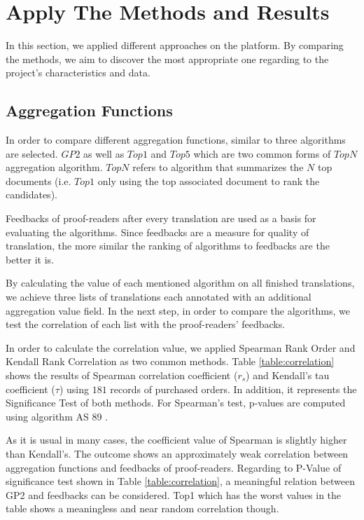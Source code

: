 \section{Apply The Methods and Results}
\label{sec:apply}
In this section, we applied different approaches on the platform. By comparing the methods, we aim to discover the most appropriate one regarding to the project's characteristics and data.

\subsection{Aggregation Functions}
In order to compare different aggregation functions, similar to \citet{agg-gp2} three algorithms are selected. $GP2$ as well as $Top1$ and $Top5$ which are two common forms of $TopN$ aggregation algorithm. $TopN$ refers to algorithm that summarizes the $N$ top documents (i.e. $Top1$ only using the top associated document to rank the candidates).

Feedbacks of proof-readers after every translation are used as a basis for evaluating the algorithms. Since feedbacks are a measure for quality of translation, the more similar the ranking of algorithms to feedbacks are the better it is. 

By calculating the value of each mentioned algorithm on all finished translations, we achieve three lists of translations each annotated with an additional aggregation value field. In the next step, in order to compare the algorithms, we test the correlation of each list with the proof-readers' feedbacks.

In order to calculate the correlation value, we applied Spearman Rank Order and Kendall Rank Correlation as two common methods. Table \ref{table:correlation} shows the results of Spearman correlation coefficient ($r_s$) and Kendall's tau coefficient ($\tau$) using $181$ records of purchased orders. In addition, it represents the Significance Test of both methods. For Spearman's test, p-values are computed using algorithm AS 89 \citep{as89}.

As it is usual in many cases, the coefficient value of Spearman is slightly higher than Kendall's. The outcome shows an approximately weak correlation between aggregation functions and feedbacks of proof-readers. Regarding to P-Value of significance test shown in Table \ref{table:correlation}, a meaningful relation between GP2 and feedbacks can be considered. Top1 which has the worst values in the table shows a meaningless and near random correlation though.

